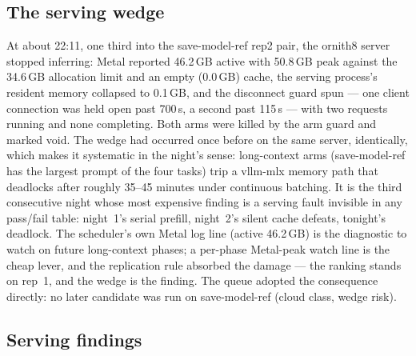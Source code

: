 \subsection{The serving wedge}\label{sec:wedge}

At about 22:11, one third into the save-model-ref rep2 pair, the ornith8 server stopped inferring: Metal reported
46.2\,GB active with 50.8\,GB peak against the 34.6\,GB allocation limit and an empty (0.0\,GB) cache, the serving
process's resident memory collapsed to 0.1\,GB, and the disconnect guard spun --- one client connection was held
open past 700\,s, a second past 115\,s --- with two requests running and none completing. Both arms were killed
by the arm guard and marked void. The wedge had occurred once before on the same server, identically, which makes
it systematic in the night's sense: long-context arms (save-model-ref has the largest prompt of the four tasks)
trip a vllm-mlx memory path that deadlocks after roughly 35--45 minutes under continuous batching. It is the
third consecutive night whose most expensive finding is a serving fault invisible in any pass/fail table:
night~1's serial prefill, night~2's silent cache defeats, tonight's deadlock. The scheduler's own Metal log line
(active 46.2\,GB) is the diagnostic to watch on future long-context phases; a per-phase Metal-peak watch line is
the cheap lever, and the replication rule absorbed the damage --- the ranking stands on rep~1, and the wedge is
the finding. The queue adopted the consequence directly: no later candidate was run on save-model-ref (cloud
class, wedge risk).

\subsection{Serving findings}\label{sec:serving3}

